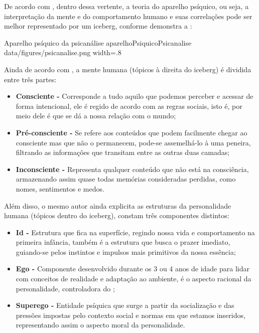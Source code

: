 De acordo com , dentro dessa vertente, a teoria do aparelho psíquico, ou seja, a interpretação da mente e do comportamento humano e suas correlações pode ser melhor representado por um iceberg, conforme demonstra a :

\image
    {Aparelho psíquico da psicanálise}
    {aparelhoPsiquicoPsicanalise}
    {data/figures/psicanalise.png}
    {width=.8\textwidth}
    {}

Ainda de acordo com , a mente humana (tópicos à direita do iceberg) é dividida entre três partes:
\begin{itemize}
    \item \textbf{Consciente -} Corresponde a tudo aquilo que podemos perceber e acessar de forma intencional, ele é regido de acordo com as regras sociais, isto é, por meio dele é que se dá a nossa relação com o mundo;
    \item \textbf{Pré-consciente -} Se refere aos conteúdos que podem facilmente chegar ao consciente mas que não o permanecem, pode-se assemelhá-lo à uma peneira, filtrando as informações que transitam entre as outras duas camadas;
    \item \textbf{Inconsciente -} Representa qualquer conteúdo que não está na consciência, armazenando assim quase todas memórias consideradas perdidas, como nomes, sentimentos e medos.
\end{itemize}

Além disso, o mesmo autor ainda explicita as estruturas da personalidade humana (tópicos dentro do iceberg), constam três componentes distintos:
\begin{itemize}
    \item \textbf{Id -} Estrutura que fica na superfície, regindo nossa vida e comportamento na primeira infância, também é a estrutura que busca o prazer imediato, guiando-se pelos instintos e impulsos mais primitivos da nossa essência;
    \item \textbf{Ego -} Componente desenvolvido durante os 3 ou 4 anos de idade para lidar com conceitos de realidade e adaptação ao ambiente, é o aspecto racional da personalidade, controladora do ;
    \item \textbf{Superego - } Entidade psíquica que surge a partir da socialização e das pressões impostas pelo contexto social e normas em que estamos inseridos, representando assim o aspecto moral da personalidade. 
\end{itemize}

